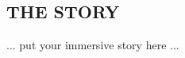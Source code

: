 \newpage



\newpage

\begin{multicols*}{2}

\subsection*{\MakeUppercase{The story}}

... put your immersive story here ...

\end{multicols*}
